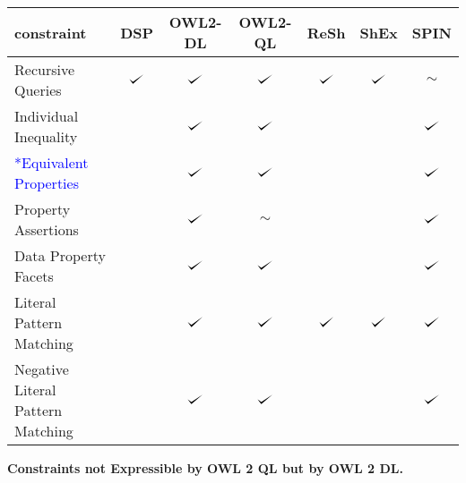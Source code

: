 \documentclass{llncs}
\def\checkmark{\tikz\fill[scale=0.4](0,.35) -- (.25,0) -- (1,.7) -- (.25,.15) -- cycle;}
\newenvironment{evaluation}{
  \scriptsize
  \sffamily
  \vspace{0.3cm}
  \begin{tabular}{l|c|c|c|c|c|c}
  \hline
  \textbf{constraint} & \textbf{DSP} & \textbf{OWL2-DL} & \textbf{OWL2-QL} & \textbf{ReSh} & \textbf{ShEx} & \textbf{SPIN} \\
  \hline

}{
  \hline
  \end{tabular}
  \linebreak
}
\begin{document}
\begin{evaluation}
Recursive Queries & $\checkmark$ & $\checkmark$ & $\checkmark$ & $\checkmark$ & $\checkmark$ & $\sim$ \\
Individual Inequality & \ding{55} & $\checkmark$ & $\checkmark$ & \ding{55} & \ding{55} & $\checkmark$ \\
\textcolor{blue}{*Equivalent Properties} & \ding{55} & $\checkmark$ & $\checkmark$ & \ding{55} & \ding{55} & $\checkmark$ \\
Property Assertions & \ding{55} & $\checkmark$ & $\sim$ & \ding{55} & \ding{55} & $\checkmark$ \\
Data Property Facets & \ding{55} & $\checkmark$ & $\checkmark$ & \ding{55} & \ding{55} & $\checkmark$ \\
Literal Pattern Matching & \ding{55} & $\checkmark$ & $\checkmark$ & $\checkmark$ & $\checkmark$ & $\checkmark$ \\
Negative Literal Pattern Matching & \ding{55} & $\checkmark$ & $\checkmark$ & & & $\checkmark$ \\
\end{evaluation}

\textbf{Constraints not Expressible by OWL 2 QL but by OWL 2 DL.}
\end{document}
